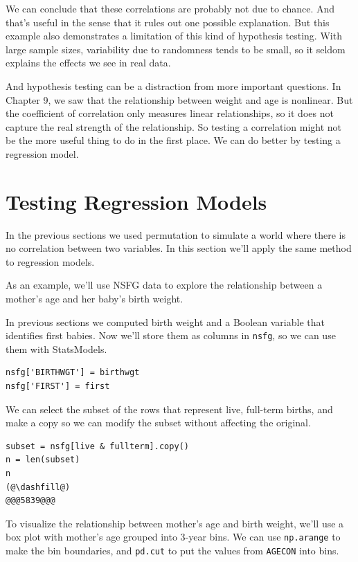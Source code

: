 We can conclude that these correlations are probably not due to chance.
And that's useful in the sense that it rules out one possible
explanation. But this example also demonstrates a limitation of this
kind of hypothesis testing. With large sample sizes, variability due to
randomness tends to be small, so it seldom explains the effects we see
in real data.

And hypothesis testing can be a distraction from more important
questions. In Chapter 9, we saw that the relationship between weight and
age is nonlinear. But the coefficient of correlation only measures
linear relationships, so it does not capture the real strength of the
relationship. So testing a correlation might not be the more useful
thing to do in the first place. We can do better by testing a regression
model.

\hypertarget{testing-regression-models}{%
\section{Testing Regression Models}\label{testing-regression-models}}

In the previous sections we used permutation to simulate a world where
there is no correlation between two variables. In this section we'll
apply the same method to regression models.

As an example, we'll use NSFG data to explore the relationship between a
mother's age and her baby's birth weight.

In previous sections we computed birth weight and a Boolean variable
that identifies first babies. Now we'll store them as columns in
\passthrough{\lstinline!nsfg!}, so we can use them with StatsModels.

\begin{lstlisting}[]
nsfg['BIRTHWGT'] = birthwgt
nsfg['FIRST'] = first
\end{lstlisting}

We can select the subset of the rows that represent live, full-term
births, and make a copy so we can modify the subset without affecting
the original.

\begin{lstlisting}[]
subset = nsfg[live & fullterm].copy()
n = len(subset)
n
(@\dashfill@)
@@@5839@@@
\end{lstlisting}

To visualize the relationship between mother's age and birth weight,
we'll use a box plot with mother's age grouped into 3-year bins. We can
use \passthrough{\lstinline!np.arange!} to make the bin boundaries, and
\passthrough{\lstinline!pd.cut!} to put the values from
\passthrough{\lstinline!AGECON!} into bins.

